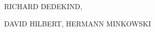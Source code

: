 \begin{center}
\vspace*{6cm}

{\Large RICHARD DEDEKIND,}

\vspace{1.5cm}
{\Large DAVID HILBERT, HERMANN MINKOWSKI}

\vspace{1.5cm}

\vspace{1.5cm}
{\small{}}
\end{center}
